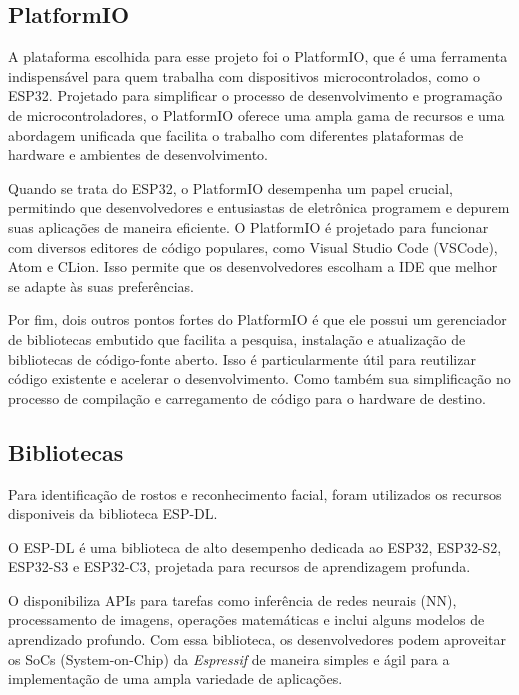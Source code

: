 \subsection{PlatformIO}\label{sec:platformio}

A plataforma escolhida para esse projeto foi o PlatformIO, 
que é uma ferramenta indispensável para quem trabalha com dispositivos 
microcontrolados, como o ESP32. Projetado para simplificar o processo 
de desenvolvimento e programação de microcontroladores, o PlatformIO 
oferece uma ampla gama de recursos e uma abordagem unificada que 
facilita o trabalho com diferentes plataformas de hardware e 
ambientes de desenvolvimento.

Quando se trata do ESP32, o PlatformIO desempenha 
um papel crucial, permitindo que desenvolvedores e entusiastas de 
eletrônica programem e depurem suas aplicações de maneira eficiente.
O PlatformIO é projetado para funcionar com diversos editores de 
código populares, como Visual Studio Code (VSCode), Atom e CLion. 
Isso permite que os desenvolvedores escolham a IDE que melhor 
se adapte às suas preferências.

Por fim, dois outros pontos fortes do PlatformIO é que ele 
possui um gerenciador de bibliotecas embutido que facilita a 
pesquisa, instalação e atualização de bibliotecas de código-fonte 
aberto. Isso é particularmente útil para reutilizar código 
existente e acelerar o desenvolvimento. Como também sua 
simplificação no processo de compilação e carregamento de 
código para o hardware de destino. 

\subsection{Bibliotecas}\label{sec:formatacaoTexto}

Para identificação de rostos e reconhecimento facial, foram utilizados 
os recursos disponiveis da biblioteca ESP-DL.

O ESP-DL é uma biblioteca de alto desempenho dedicada ao ESP32, ESP32-S2,
ESP32-S3 e ESP32-C3, projetada para recursos de aprendizagem profunda.

O  disponibiliza APIs para tarefas como inferência 
de redes neurais (NN), processamento de imagens, operações matemáticas 
e inclui alguns modelos de aprendizado profundo. Com essa biblioteca, 
os desenvolvedores podem aproveitar os SoCs (System-on-Chip) da 
\textit{Espressif} de maneira simples e ágil para a implementação 
de uma ampla variedade de aplicações.




